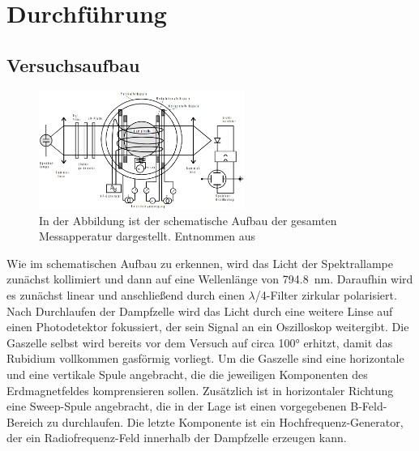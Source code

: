 \newpage
\section{Durchführung}
    \subsection{Versuchsaufbau}

        \FloatBarrier

        \begin{figure}[h]
          \centering
          \includegraphics[width = 0.6\textwidth]{pictures/Aufbau.png}
          \caption{In der Abbildung ist der schematische Aufbau der gesamten Messapperatur dargestellt. Entnommen aus \cite{tu_dortmund_versuchsanleitung_2021}}
          \label{fig:Aufbau}
        \end{figure}

        \FloatBarrier

        \noindent
        Wie im schematischen Aufbau zu erkennen, wird das Licht der Spektrallampe zunächst kollimiert und dann auf eine Wellenlänge von \SI{794.8}{\nano\metre}. Daraufhin wird es zunächst linear und anschließend 
        durch einen $\lambda$/4-Filter zirkular polarisiert. Nach Durchlaufen der Dampfzelle wird das Licht durch eine weitere Linse auf einen Photodetektor fokussiert, der sein Signal an ein Oszilloskop 
        weitergibt. Die Gaszelle selbst wird bereits vor dem Versuch auf circa 100° erhitzt, damit das Rubidium vollkommen gasförmig vorliegt. Um die Gaszelle sind eine horizontale und eine vertikale Spule 
        angebracht, die die jeweiligen Komponenten des Erdmagnetfeldes komprensieren sollen. Zusätzlich ist in horizontaler Richtung eine Sweep-Spule angebracht, die in der Lage ist einen vorgegebenen 
        B-Feld-Bereich zu durchlaufen. Die letzte Komponente ist ein Hochfrequenz-Generator, der ein Radiofrequenz-Feld innerhalb der Dampfzelle erzeugen kann.

